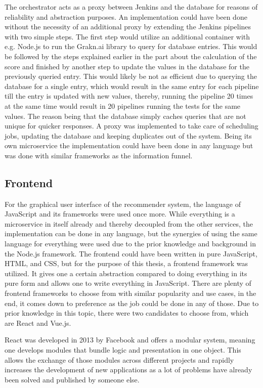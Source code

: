 The orchestrator acts as a proxy between Jenkins and the database for reasons of reliability and abstraction purposes.
An implementation could have been done without the necessity of an additional proxy by extending the Jenkins pipelines with two simple steps. The first step would utilize an additional container with e.g. Node.js to run the Grakn.ai library to query for database entries. This would be followed by the steps explained earlier in the part about the calculation of the score and finished by another step to update the values in the database for the previously queried entry. This would likely be not as efficient due to querying the database for a single entry, which would result in the same entry for each pipeline till the entry is updated with new values, thereby, running the pipeline 20 times at the same time would result in 20 pipelines running the tests for the same values. The reason being that the database simply caches queries that are not unique for quicker responses. A proxy was implemented to take care of scheduling jobs, updating the database and keeping duplicates out of the system. Being its own microservice the implementation could have been done in any language but was done with similar frameworks as the information funnel.
\subsection{Frontend}
\label{sec:fronted}
For the graphical user interface of the recommender system, the language of JavaScript and its frameworks were used once more. While everything is a microservice in itself already and thereby decoupled from the other services, the implementation can be done in any language, but the synergies of using the same language for everything were used due to the prior knowledge and background in the Node.js framework.
The frontend could have been written in pure JavaScript, HTML, and CSS, but for the purpose of this thesis, a frontend framework was utilized. It gives one a certain abstraction compared to doing everything in its pure form and allows one to write everything in JavaScript. There are plenty of frontend frameworks to choose from with similar popularity and use cases, in the end, it comes down to preference as the job could be done in any of those. Due to prior knowledge in this topic, there were two candidates to choose from, which are React and Vue.js.

React was developed in 2013 by Facebook and offers a modular system, meaning one develops modules that bundle logic and presentation in one object. This allows the exchange of those modules across different projects and rapidly increases the development of new applications as a lot of problems have already been solved and published by someone else.

